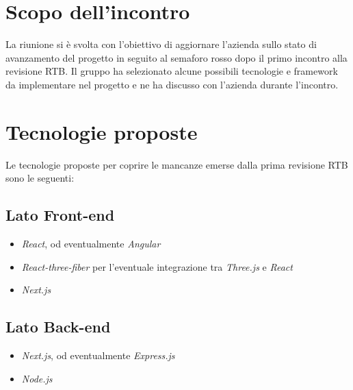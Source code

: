 \section{Scopo dell'incontro} \label{sec:scopo}
La riunione si è svolta con l'obiettivo di aggiornare l'azienda \nomeAzienda \space sullo stato di avanzamento del progetto in seguito al semaforo rosso dopo il primo incontro alla revisione RTB. Il gruppo ha selezionato alcune possibili tecnologie e framework da implementare nel progetto e ne ha discusso con l'azienda durante l'incontro.

\section{Tecnologie proposte} \label{sec:argomenti}
\noindent Le tecnologie proposte per coprire le mancanze emerse dalla prima revisione RTB sono le seguenti:
\subsection{Lato Front-end}
\begin{itemize}
    \item \textit{React}, od eventualmente \textit{Angular}
    \item \textit{React-three-fiber} per l'eventuale integrazione tra \textit{Three.js} e \textit{React}
    \item \textit{Next.js}
\end{itemize}
\subsection{Lato Back-end}
\begin{itemize}
    \item \textit{Next.js}, od eventualmente \textit{Express.js}
    \item \textit{Node.js}
\end{itemize}

